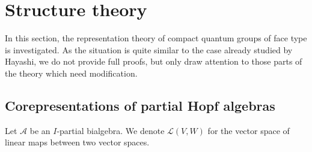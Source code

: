 \section{Structure theory}

In this section, the representation theory of compact quantum groups of face type is investigated. As the situation is quite similar to the case already studied by Hayashi, we do not provide full proofs, but only draw attention to those parts of the theory which need modification.

\subsection{Corepresentations of partial Hopf algebras}


Let $\mathscr{A}$ be an $I$-partial bialgebra. We denote $\mathcal{L}(V,W)$ for the vector space of linear maps between two vector spaces.

